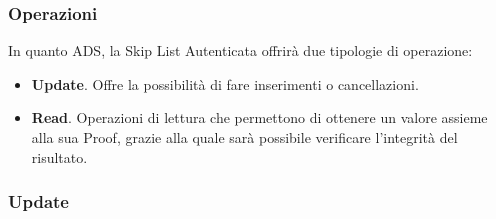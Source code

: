 		\subsubsection{Operazioni}
		

			In quanto ADS, la Skip List Autenticata offrirà due tipologie di operazione:
			
			\begin{itemize}
				\item \textbf{Update}. Offre la possibilità di fare inserimenti o cancellazioni.
				\item \textbf{Read}. Operazioni di lettura che permettono di ottenere un valore assieme alla sua Proof, grazie alla quale sarà possibile verificare l'integrità del risultato.
			\end{itemize}
			
	\subsubsection{Update}
	

